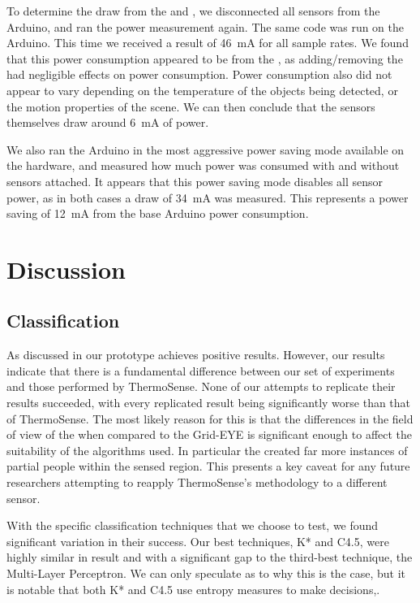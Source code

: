 \documentclass[../thesis/thesis.tex]{subfiles}
\begin{document}
To determine the draw from the \pir and \iar, we disconnected all sensors from the Arduino, and ran the power measurement again. The same code was run on the Arduino. This time we received a result of 46~mA  for all sample rates. We found that this power consumption appeared to be from the \mlx, as adding/removing the \pir had negligible effects on power consumption. Power consumption also did not appear to vary depending on the temperature of the objects being detected, or the motion properties of the scene. We can then conclude that the sensors themselves draw around 6~mA of power.

We also ran the Arduino in the most aggressive power saving mode available on the hardware, and measured how much power was consumed with and without sensors attached. It appears that this power saving mode disables all sensor power, as in both cases a draw of 34~mA was measured. This represents a power saving of 12~mA from the base Arduino power consumption.

\section{Discussion}

\subsection{Classification}
As discussed in  our prototype achieves positive results. However, our results indicate that there is a fundamental difference between our set of experiments and those performed by ThermoSense. None of our attempts to replicate their results succeeded, with every replicated result being significantly worse than that of ThermoSense. The most likely reason for this is that the differences in the field of view of the \mlx when compared to the Grid-EYE is significant enough to affect the suitability of the algorithms used. In particular the \mlx created far more instances of partial people within the sensed region. This presents a key caveat for any future researchers attempting to reapply ThermoSense's methodology to a different sensor.

With the specific classification techniques that we choose to test, we found significant variation in their success. Our best techniques, K* and C4.5, were highly similar in result and with a significant gap to the third-best technique, the Multi-Layer Perceptron. We can only speculate as to why this is the case, but it is notable that both K* and C4.5 use entropy measures to make decisions,.
\end{document}
